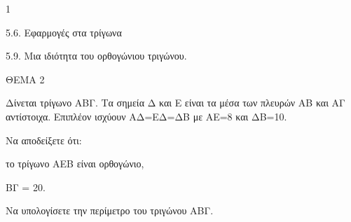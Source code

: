 \begin{ylh}{1}
    \item 5.6. Εφαρμογές στα τρίγωνα
    \item 5.9. Μια ιδιότητα του ορθογώνιου τριγώνου.
\end{ylh}

ΘΕΜΑ 2

Δίνεται τρίγωνο ΑΒΓ. Τα σημεία Δ και Ε είναι τα μέσα των πλευρών ΑΒ και ΑΓ αντίστοιχα. Επιπλέον ισχύουν ΑΔ=ΕΔ=ΔΒ με ΑΕ=8 και ΔΒ=10.

\begin{alist}
\item Να αποδείξετε ότι:
\begin{rlist}
\item το τρίγωνο ΑΕΒ είναι ορθογώνιο, 
\item ΒΓ = 20. 
\end{rlist}

\item Να υπολογίσετε την περίμετρο του τριγώνου ΑΒΓ. 

\begin{center}
\end{center}
\end{alist}
